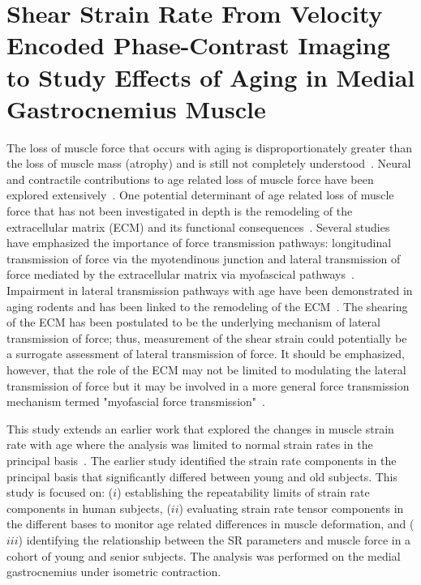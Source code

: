 \section {Shear Strain Rate From Velocity Encoded Phase-Contrast Imaging to Study Effects of Aging in Medial Gastrocnemius Muscle}
\label{sec: SR_SHEAR}
The loss of muscle force that occurs with aging is disproportionately greater than the loss of muscle mass (atrophy) and is still not completely understood~\cite{RNSS6}.
Neural and contractile contributions to age related loss of muscle force have been explored extensively~\cite{RNS13}.
One potential determinant of age related loss of muscle force that has not been investigated in depth is the remodeling of the extracellular matrix (ECM) and its functional consequences~\cite{RNSS8}. 
Several studies have emphasized the importance of force transmission pathways: longitudinal transmission of force via the myotendinous junction and lateral transmission of force mediated by the extracellular matrix via myofascical pathways~\cite{RNSS8, RNIRamaswamy}.
Impairment in lateral transmission pathways with age have been demonstrated in aging rodents and has been linked to the remodeling of the ECM~\cite{RNIRamaswamy}. 
The shearing of the ECM has been postulated to be the underlying mechanism of lateral transmission of force; thus, measurement of the shear strain could potentially be a surrogate assessment of lateral transmission of force.
It should be emphasized, however, that the role of the ECM may not be limited to modulating the lateral transmission of force but it may be involved in a more general force transmission mechanism termed "myofascial force transmission"~\cite{RNSS4}.

This study extends an earlier work that explored the changes in muscle strain rate with age where the analysis was limited to normal strain rates in the principal basis~\cite{RNS16}.
The earlier study identified the strain rate components in the principal basis that significantly differed between young and old subjects. 
This study is focused on: ($i$) establishing the repeatability limits of strain rate components in human subjects, ($ii$) evaluating strain rate tensor components in the different bases to monitor age related differences in muscle deformation, and ($iii$) identifying the relationship between the SR parameters and muscle force in a cohort of young and senior subjects. 
The analysis was performed on the medial gastrocnemius under isometric contraction.

